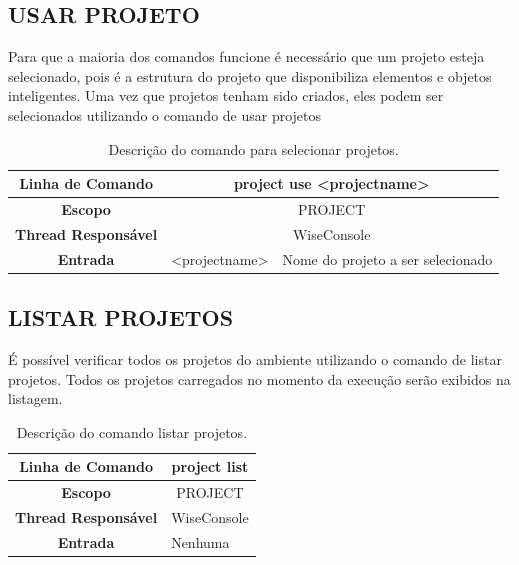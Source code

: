 \subsection{USAR PROJETO}\label{sec:use_projects}

Para que a maioria dos comandos funcione é necessário que um projeto esteja selecionado, pois é a estrutura do projeto que disponibiliza elementos e objetos inteligentes. Uma vez que projetos tenham sido criados, eles podem ser selecionados utilizando o comando de usar projetos

\begin{center}
	\begin{table}[!htbp]
		\begin{tabularx}{\textwidth}{c|c|X}
			\toprule
			\textbf{Linha de Comando} & \multicolumn{2}{c}{project use <project\underline{\space\space}name>} \\
			\midrule
			\textbf{Escopo} & \multicolumn{2}{c}{PROJECT} \\
			\hline
			\textbf{Thread Responsável} & \multicolumn{2}{c}{WiseConsole} \\
			\hline
			\textbf{Entrada} & <project\underline{\space\space}name> & Nome do projeto a ser selecionado \\
			\bottomrule
		\end{tabularx}
		\caption{Descrição do comando para selecionar projetos.}
		\label{tab:use_project}
	\end{table}
\end{center}

\subsection{LISTAR PROJETOS}\label{sec:list_projects}

É possível verificar todos os projetos do ambiente utilizando o comando de listar projetos. Todos os projetos carregados no momento da execução serão exibidos na listagem.

\begin{center}
	\begin{table}[!htbp]
		\begin{tabularx}{\textwidth}{c|X}
			\toprule
			\textbf{Linha de Comando} & \multicolumn{1}{c}{project list} \\
			\midrule
			\textbf{Escopo} & \multicolumn{1}{c}{PROJECT} \\
			\hline
			\textbf{Thread Responsável} & \multicolumn{1}{c}{WiseConsole} \\
			\hline
			\textbf{Entrada} & Nenhuma \\
			\bottomrule
		\end{tabularx}
		\caption{Descrição do comando listar projetos.}
		\label{tab:list_project}
	\end{table}
\end{center}

